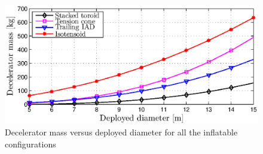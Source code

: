 \begin{figure}[H]
\includegraphics[width = 1.0\textwidth]{Figure/mass_dia.eps}
\caption{Decelerator mass versus deployed diameter for all the inflatable configurations}
\label{fig:mass_dia}
\end{figure}
